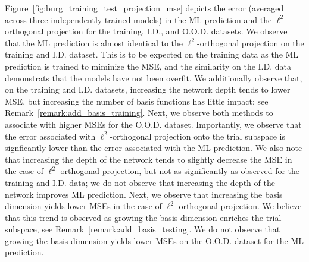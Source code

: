 \documentclass[3p,computermodern,10pt]{elsarticle}
\begin{document}
%
%
%

Figure~\ref{fig:burg_training_test_projection_mse} depicts the error (averaged across three independently trained models) in the ML prediction and the $\ell^2$-orthogonal projection for the training, I.D., and O.O.D. datasets. We observe that the ML prediction is almost identical to the $\ell^2$-orthogonal projection on the training and I.D. dataset. This is to be expected on the training data as the ML prediction is trained to miminize the MSE, and the similarity on the I.D. data demonstrats that the models have not been overfit. We additionally observe that, on the training and I.D. datasets, increasing the network depth tends to lower MSE, but increasing the number of basis functions has little impact; see Remark~\ref{remark:add_basis_training}. Next, we observe both methods to associate with higher MSEs for the O.O.D. dataset. Importantly, we observe that the error associated with $\ell^2$-orthogonal projection onto the trial subspace is signficantly lower than the error associated with the ML prediction. We also note that increasing the depth of the network tends to slightly decrease the MSE in the case of $\ell^2$-orthogonal projection, but not as significantly as observed for the training and I.D. data; we do not observe that increasing the depth of the network improves ML prediction. Next, we observe that increasing the basis dimension yields lower MSEs in the case of $\ell^2$ orthogonal projection. We believe that this trend is observed as growing the basis dimension enriches the trial subspace, see Remark~\ref{remark:add_basis_testing}. We do not observe that growing the basis dimension yields lower MSEs on the O.O.D. dataset for the ML prediction. 
\end{document}
